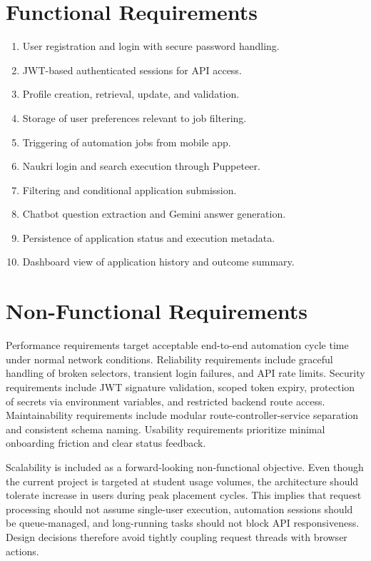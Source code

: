 \documentclass[12pt,a4paper,oneside]{report}
\begin{document}
\section{Functional Requirements}
\begin{enumerate}[leftmargin=0.35in]
\item User registration and login with secure password handling.
\item JWT-based authenticated sessions for API access.
\item Profile creation, retrieval, update, and validation.
\item Storage of user preferences relevant to job filtering.
\item Triggering of automation jobs from mobile app.
\item Naukri login and search execution through Puppeteer.
\item Filtering and conditional application submission.
\item Chatbot question extraction and Gemini answer generation.
\item Persistence of application status and execution metadata.
\item Dashboard view of application history and outcome summary.
\end{enumerate}

\section{Non-Functional Requirements}
Performance requirements target acceptable end-to-end automation cycle time under normal network conditions. Reliability requirements include graceful handling of broken selectors, transient login failures, and API rate limits. Security requirements include JWT signature validation, scoped token expiry, protection of secrets via environment variables, and restricted backend route access. Maintainability requirements include modular route-controller-service separation and consistent schema naming. Usability requirements prioritize minimal onboarding friction and clear status feedback.

Scalability is included as a forward-looking non-functional objective. Even though the current project is targeted at student usage volumes, the architecture should tolerate increase in users during peak placement cycles. This implies that request processing should not assume single-user execution, automation sessions should be queue-managed, and long-running tasks should not block API responsiveness. Design decisions therefore avoid tightly coupling request threads with browser actions.
\end{document}
